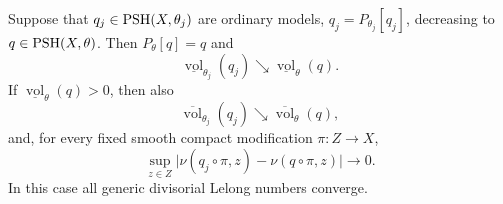 \begin{theorem}\label{thm:decreasing-model-volume-continuity}
Suppose that $q_j\in\mathrm{PSH}(X,\theta_j)$ are ordinary models, $q_j=P_{\theta_j}[q_j]$, decreasing to $q\in\mathrm{PSH}(X,\theta)$. Then $P_\theta[q]=q$ and
\[
 \underline{\operatorname{vol}}_{\theta_j}(q_j)\searrow
       \underline{\operatorname{vol}}_\theta(q).
\]
If $\underline{\operatorname{vol}}_\theta(q)>0$, then also
\[
 \overline{\operatorname{vol}}_{\theta_j}(q_j)\searrow
       \overline{\operatorname{vol}}_\theta(q),
\]
and, for every fixed smooth compact modification $\pi\colon Z\to X$,
\[
 \sup_{z\in Z}\bigl|\nu(q_j\circ\pi,z)-\nu(q\circ\pi,z)\bigr|
       \longrightarrow0.
\]
In this case all generic divisorial Lelong numbers converge.
\end{theorem}

